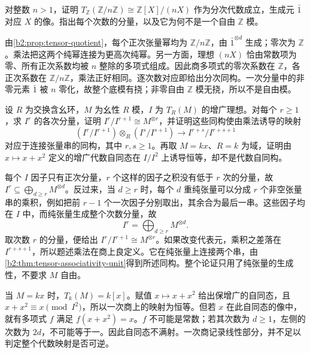 \begin{exercise}\label{b2:ex:08-tensor-torsion-module}
	对整数 \(n>1\)，证明 \(T_{\mathbb Z}(\mathbb Z/n\mathbb Z)\cong\mathbb Z[X]/(nX)\) 作为分次代数成立，生成元 \(\bar1\) 对应 \(X\) 的像。指出每个次数的分量，以及它为何不是一个自由 \(\mathbb Z\) 模。
\end{exercise}
\begin{solution}
	由\cref{b2:prop:tensor-quotient}，每个正次张量幂均为 \(\mathbb Z/n\mathbb Z\)，由 \(\bar1^{\otimes d}\) 生成；零次为 \(\mathbb Z\)。乘法把这两个纯幂连接为更高次纯幂。另一方面，理想 \((nX)\) 恰由常数项为零、所有正次系数均被 \(n\) 整除的多项式组成。因此商多项式的零次系数在 \(\mathbb Z\)，各正次系数在 \(\mathbb Z/n\mathbb Z\)，乘法正好相同。逐次数对应即给出分次同构。一次分量中的非零元素 \(\bar1\) 被 \(n\) 零化，故整个底模有挠；非零自由 \(\mathbb Z\) 模无挠，所以不是自由模。
\end{solution}

\begin{exercise}\label{b2:ex:08-augmentation}
	设 \(R\) 为交换含幺环，\(M\) 为幺性 \(R\) 模，\(I\) 为 \(T_R(M)\) 的增广理想。对每个 \(r\ge1\)，求 \(I^r\) 的各次分量，证明 \(I^r/I^{r+1}\cong M^{\otimes r}\)，并证明这些同构使由乘法诱导的映射
	\[
		(I^r/I^{r+1})\otimes_R(I^s/I^{s+1})\longrightarrow I^{r+s}/I^{r+s+1}
	\]
	对应于连接张量串的同构，其中 \(r,s\ge1\)。再取 \(M=kx\)、\(R=k\) 为域，证明由 \(x\mapsto x+x^2\) 定义的增广代数自同态在 \(I/I^2\) 上诱导恒等，却不是代数自同构。
\end{exercise}
\begin{solution}
	每个 \(I\) 因子只有正次分量，\(r\) 个这样的因子之积没有低于 \(r\) 次的分量，故 \(I^r\subseteq\bigoplus_{d\ge r}M^{\otimes d}\)。反过来，当 \(d\ge r\) 时，每个 \(d\) 重纯张量可以分成 \(r\) 个非空张量串的乘积，例如把前 \(r-1\) 个一次因子分别取出，其余合为最后一串。这些因子均在 \(I\) 中，而纯张量生成整个次数分量，故
	\[
		I^r=\bigoplus_{d\ge r}M^{\otimes d}.
	\]
	取次数 \(r\) 的分量，便给出 \(I^r/I^{r+1}\cong M^{\otimes r}\)。如果改变代表元，乘积之差落在 \(I^{r+s+1}\)，所以题述乘法在商上良定义。它在纯张量上连接两个串，由\cref{b2:thm:tensor-associativity-unit}得到所述同构。整个论证只用了纯张量的生成性，不要求 \(M\) 自由。

	当 \(M=kx\) 时，\(T_k(M)=k[x]\)。赋值 \(x\mapsto x+x^2\) 给出保增广的自同态，且 \(x+x^2\equiv x\pmod{I^2}\)，所以一次商上的映射为恒等。但若 \(x\) 在此自同态的像中，就有多项式 \(f\) 满足 \(f(x+x^2)=x\)。\(f\) 不可能是常数；若其次数为 \(d\ge1\)，左侧的次数为 \(2d\)，不可能等于一。因此自同态不满射。一次商记录线性部分，并不足以判定整个代数映射是否可逆。
\end{solution}

